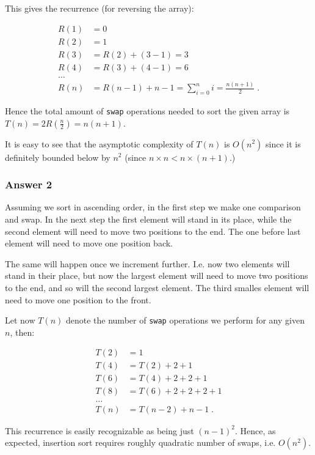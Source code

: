 \documentclass[11pt]{article}
\begin{document}
This gives the recurrence (for reversing the array):

\begin{align*}
  R(1) &= 0 \\
  R(2) &= 1 \\
  R(3) &= R(2) + (3 - 1) = 3 \\
  R(4) &= R(3) + (4 - 1) = 6 \\
  \dots \\
  R(n) &= R(n-1) + n - 1 = \sum_{i=0}^ni = \frac{n(n+1)}{2}\;.
\end{align*}

Hence the total amount of \texttt{swap} operations needed to sort the given array
is \(T(n) = 2R(\frac{n}{2}) = n(n+1)\).

It is easy to see that the asymptotic complexity of \(T(n)\) is \(O(n^2)\) since
it is definitely bounded below by \(n^2\) (since \(n \times n < n \times (n +
    1)\).)

\subsubsection{Answer 2}
\label{sec:orgheadline2}
Assuming we sort in ascending order, in the first step we make one
comparison and swap.  In the next step the first element will stand in its
place, while the second element will need to move two positions to the end.
The one before last element will need to move one position back.

The same will happen once we increment further.  I.e. now two elements will
stand in their place, but now the largest element will need to move two
positions to the end, and so will the second largest element.  The third
smalles element will need to move one position to the front.

Let now \(T(n)\) denote the number of \texttt{swap} operations we perform for any
given \(n\), then:

\begin{align*}
  T(2) &= 1 \\
  T(4) &= T(2) + 2 + 1 \\
  T(6) &= T(4) + 2 + 2 + 1 \\
  T(8) &= T(6) + 2 + 2 + 2 + 1 \\
  \dots \\
  T(n) &= T(n-2) + n - 1\;.
\end{align*}

This recurrence is easily recognizable as being just \((n-1)^2\).  Hence, as
expected, insertion sort requires roughly quadratic number of swaps,
i.e. \(O(n^2)\).
\end{document}
